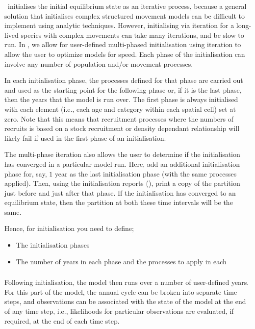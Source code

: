 \SPM\ initialises the initial equilibrium state as an iterative process, because a general solution that initialises complex structured movement models can be difficult to implement using analytic techniques. However, initialising via iteration for a long-lived species with complex movements can take many iterations, and be slow to run. In \SPM, we allow for user-defined multi-phased initialisation using iteration to allow the user to optimize models for speed. Each phase of the initialisation can involve any number of population and/or movement processes. 

In each initialisation phase, the processes defined for that phase are carried out and used as the starting point for the following phase or, if it is the last phase, then the years that the model is run over. The first phase is always initialised with each element (i.e., each age and category within each spatial cell) set at zero. Note that this means that recruitment processes where the numbers of recruits is based on a stock recruitment or density dependant relationship will likely fail if used in the first phase of an initialisation. 

The multi-phase iteration also allows the user to determine if the initialisation has converged in a particular model run. Here, add an additional initialisation phase for, say, $1$ year as the last initialisation phase (with the same processes applied). Then, using the initialisation reports (), print a copy of the partition just before and just after that phase. If the initialisation has converged to an equilibrium state, then the partition at both these time intervals will be the same.

Hence, for initialisation you need to define;
\begin{itemize}
  \item The initialisation phases
  \item The number of years in each phase and the processes to apply in each
\end{itemize}

\subsubsection{}

Following initialisation, the model then runs over a number of user-defined years. For this part of the model, the annual cycle can be broken into separate time steps, and observations can be associated with the state of the model at the end of any time step, i.e., likelihoods for particular observations are evaluated, if required, at the end of each time step. 

